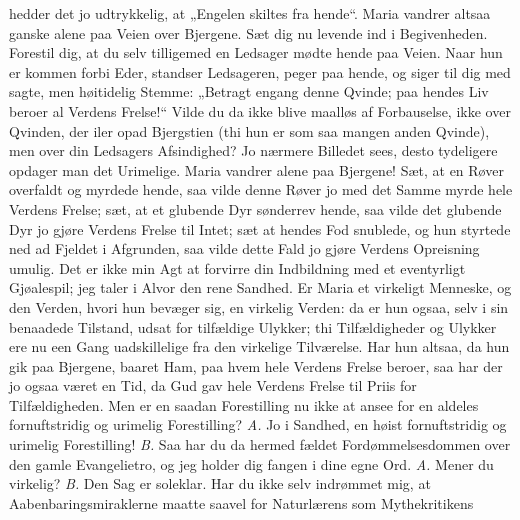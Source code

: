 \documentclass[12pt,a4paper]{book}
\begin{document}
hedder det jo udtrykkelig, at „Engelen skiltes fra hende“. Maria vandrer altsaa
ganske alene paa Veien over Bjergene. Sæt dig nu levende ind i Begivenheden.
Forestil dig, at du selv tilligemed en Ledsager mødte hende paa Veien. Naar hun
er kommen forbi Eder, standser Ledsageren, peger paa hende, og siger til dig med
sagte, men høitidelig Stemme: „Betragt engang denne Qvinde; paa hendes Liv
beroer al Verdens Frelse!“ Vilde du da ikke blive maalløs af Forbauselse, ikke
over Qvinden, der iler opad Bjergstien (thi hun er som saa mangen anden Qvinde),
men over din Ledsagers Afsindighed? Jo nærmere Billedet sees, desto tydeligere
opdager man det Urimelige. Maria vandrer alene paa Bjergene! Sæt,
at en Røver overfaldt og myrdede hende, saa vilde denne Røver jo med det Samme
myrde hele Verdens Frelse; sæt, at et glubende Dyr sønderrev hende, saa vilde
det glubende Dyr jo gjøre Verdens Frelse til Intet; sæt at hendes Fod snublede,
og hun styrtede ned ad Fjeldet i Afgrunden, saa vilde dette Fald jo gjøre
Verdens Opreisning umulig. Det er ikke min Agt at forvirre din Indbildning med
et eventyrligt Gjøalespil; jeg taler i Alvor den rene Sandhed. Er Maria et
virkeligt Menneske, og den Verden, hvori hun bevæger sig, en virkelig Verden: da
er hun ogsaa, selv i sin benaadede Tilstand, udsat for tilfældige Ulykker; thi
Tilfældigheder og Ulykker ere nu een Gang uadskillelige fra den virkelige
Tilværelse. Har hun altsaa, da hun gik paa Bjergene, baaret Ham, paa hvem hele
Verdens Frelse beroer, saa har der jo ogsaa været en Tid, da Gud gav hele
Verdens Frelse til Priis for Tilfældigheden. Men er en saadan Forestilling nu
ikke at ansee for en aldeles fornuftstridig og urimelig Forestilling?
\textit{A.} Jo i Sandhed, en høist fornuftstridig og urimelig Forestilling!
\textit{B.} Saa har du da hermed fældet Fordømmelsesdommen over den gamle
Evangelietro, og jeg holder dig fangen i dine egne Ord. \textit{A.} Mener du
virkelig? \textit{B.} Den Sag er soleklar. Har du ikke selv indrømmet mig, at
Aabenbaringsmiraklerne maatte saavel for Naturlærens som Mythekritikens
\end{document}
